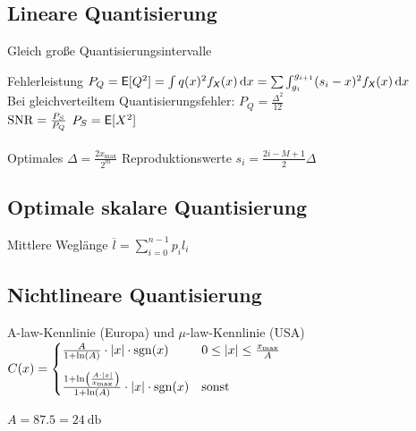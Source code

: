 \documentclass[fs, footer]{latex4ei}
\begin{document}
\begin{multicols*}{4}
	\subsection{Lineare Quantisierung}
	Gleich große Quantisierungsintervalle

	Fehlerleistung $P_Q = \E[Q^2] = \int q(x)^2 f_{\X}(x) \diff x = \sum \int_{g_i}^{g_{i+1}} (s_i - x)^2 f_{\X}(x) \diff x$\\
	Bei gleichverteiltem Quantisierungsfehler: $P_Q = \frac{\Delta^2}{12}$\\
	$\mathrm{SNR} = \frac{P_S}{P_Q}$ \qquad $P_S = \operatorname{\textsf{E}}[X^2]$\\
	\\
	Optimales $\Delta = \frac{2 x_{\max}}{2^m}$ \qquad Reproduktionswerte $s_i = \frac{2i - M + 1}{2} \Delta$

	\subsection{Optimale skalare Quantisierung}
		
			Mittlere Weglänge $\overline l = \sum \limits_{i= 0}^{n-1} p_i l_i$

	\subsection{Nichtlineare Quantisierung}
	A-law-Kennlinie (Europa) und $\mu$-law-Kennlinie (USA)\\
	$C(x) = \begin{cases} \frac{A}{1 + \ln(A)} \cdot \left\vert x\right\vert \cdot \operatorname{sgn}(x) & 0 \le \left\vert x\right\vert \le \frac{x_{\max}}{A} \\[1em]
	\frac{1 + \ln\left( \frac{A \cdot \left\vert x\right\vert}{x_{\max}} \right)}{1 + \ln(A)} \cdot \left\vert x\right\vert \cdot \operatorname{sgn}(x) & \text{sonst} \end{cases}$

	$A = 87.5 = \SI{24}{\decibel}$


\end{multicols*}
\end{document}
